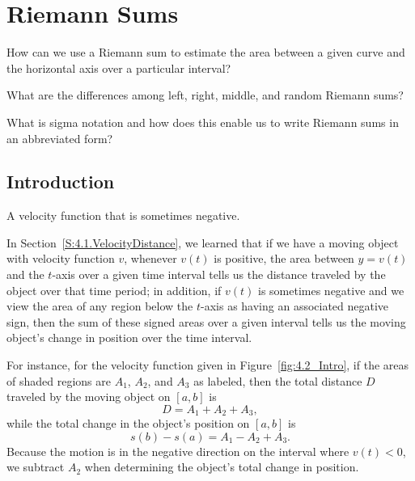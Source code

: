 \section{Riemann Sums} \label{S:4.2.Riemann}

\begin{goals}
\item How can we use a Riemann sum to estimate the area between a given curve and the horizontal axis over a particular interval?
\item What are the differences among left, right, middle, and random Riemann sums?
\item What is sigma notation and how does this enable us to write Riemann sums in an abbreviated form?
\end{goals}

\subsection*{Introduction}

\begin{marginfigure}[3in] %
\caption{A velocity function that is sometimes negative.} \label{fig:4.2_Intro}
\end{marginfigure}

In Section~\ref{S:4.1.VelocityDistance}, we learned that if we have a moving object with velocity function $v$, whenever $v(t)$ is positive, the area between $y = v(t)$ and the $t$-axis over a given time interval tells us the distance traveled by the object over that time period; in addition, if $v(t)$ is sometimes negative and we view the area of any region below the $t$-axis as having an associated negative sign, then the sum of these signed areas over a given interval tells us the moving object's change in position over the time interval.

For instance, for the velocity function given in Figure~\ref{fig:4.2_Intro}, if the areas of shaded regions are $A_1$, $A_2$, and $A_3$ as labeled, then the total distance $D$ traveled by the moving object on $[a,b]$ is 
\[D = A_1 + A_2 + A_3,\]
while the total change in the object's position on $[a,b]$ is 
\[s(b) - s(a) = A_1 - A_2 + A_3.\]
Because the motion is in the negative direction on the interval where $v(t) < 0$, we subtract $A_2$ when determining the object's total change in position.

